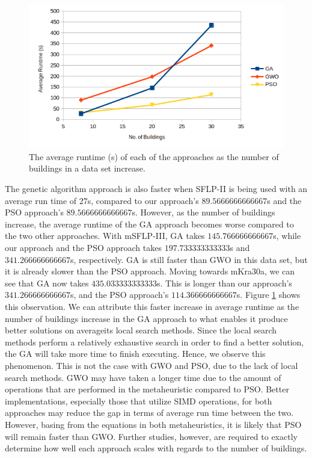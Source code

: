 \begin{figure}[h!]
\centering
\includegraphics[scale=0.65]{./images/chap07-rd/approaches-average-runtime-over-no-of-buildings.png}
\caption{The average runtime (s) of each of the approaches as the number of buildings in a data set increase.}
\label{graph-approaches-runtime-no-buildings}
\end{figure}

The genetic algorithm approach is also faster when SFLP-II is being used with an average run time of $27$s, compared to our approach's $89.5666666666667$s and the PSO approach's $89.5666666666667$s. However, as the number of buildings increase, the average runtime of the GA approach becomes worse compared to the two other approaches. With mSFLP-III, GA takes $145.766666666667$s, while our approach and the PSO approach takes $197.733333333333$s and $341.266666666667$s, respectively. GA is still faster than GWO in this data set, but it is already slower than the PSO approach. Moving towards mKra30a, we can see that GA now takes $435.033333333333$s. This is longer than our approach's $341.266666666667$s, and the PSO approach's $114.366666666667$s. Figure \ref{graph-approaches-runtime-no-buildings} shows this observation. We can attribute this faster increase in average runtime as the number of buildings increase in the GA approach to what enables it produce better solutions on average\textemdash its local search methods. Since the local search methods perform a relatively exhaustive search in order to find a better solution, the GA will take more time to finish executing. Hence, we observe this phenomenon. This is not the case with GWO and PSO, due to the lack of local search methods. GWO may have taken a longer time due to the amount of operations that are performed in the metaheuristic compared to PSO. Better implementations, especially those that utilize SIMD operations, for both approaches may reduce the gap in terms of average run time between the two. However, basing from the equations in both metaheuristics, it is likely that PSO will remain faster than GWO. Further studies, however, are required to exactly determine how well each approach scales with regards to the number of buildings.

